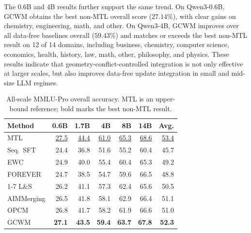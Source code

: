 \documentclass{article}
\begin{document}
The 0.6B and 4B results further support the same trend.
On Qwen3-0.6B, GCWM obtains the best non-MTL overall score (\(27.14\%\)), with clear gains on chemistry, engineering, math, and other.
On Qwen3-4B, GCWM improves over all data-free baselines overall (\(59.43\%\)) and matches or exceeds the best non-MTL result on 12 of 14 domains, including business, chemistry, computer science, economics, health, history, law, math, other, philosophy, and physics.
These results indicate that geometry-conflict-controlled integration is not only effective at larger scales, but also improves data-free update integration in small and mid-size LLM regimes.

\providecommand{\best}[1]{\textbf{#1}}
\providecommand{\ub}[1]{\underline{#1}}


\begin{table}[!htbp]
\centering
\caption{All-scale MMLU-Pro overall accuracy. MTL is an upper-bound reference; bold marks the best non-MTL result.}
\label{tab:app_mmlu_op_all_scales}
\footnotesize
\setlength{\tabcolsep}{5pt}
\renewcommand{\arraystretch}{1.08}
\begin{tabular}{lrrrrrr}
\toprule[0.9pt]
Method & 0.6B & 1.7B & 4B & 8B & 14B & Avg. \\
\midrule
\rowcolor{mtlGold} MTL & \ub{27.5} & \ub{44.4} & \ub{61.0} & \ub{65.3} & \ub{68.6} & \ub{53.4} \\
\rowcolor{refGray} Seq.\ SFT & 24.4 & 36.8 & 51.6 & 55.2 & 60.4 & 45.7 \\
\rowcolor{refGray} EWC & 24.9 & 40.0 & 55.4 & 60.4 & 65.3 & 49.2 \\
\rowcolor{refGray} FOREVER & 24.7 & 38.5 & 54.7 & 59.6 & 66.5 & 48.8 \\
\cmidrule(lr){1-7}
\rowcolor{mergeBlue} L\&S & 26.2 & 41.1 & 57.3 & 62.4 & 65.6 & 50.5 \\
\rowcolor{mergeBlue} AIMMerging & 26.5 & 41.8 & 58.1 & 62.9 & 66.4 & 51.1 \\
\rowcolor{mergeBlue} OPCM & 26.8 & 41.7 & 58.2 & 61.9 & 66.6 & 51.0 \\
\rowcolor{rcwmBlue} GCWM & \best{27.1} & \best{43.5} & \best{59.4} & \best{63.7} & \best{67.8} & \best{52.3} \\
\bottomrule[0.9pt]
\end{tabular}
\end{table}
\end{document}
